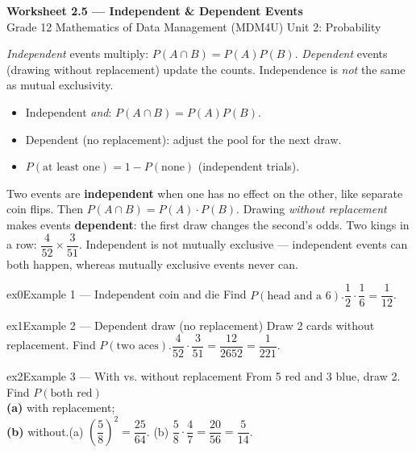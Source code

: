 \documentclass[11pt]{article}
\begin{document}
\begin{center}
{\LARGE\bfseries\color{titleblue}Worksheet 2.5 --- Independent \& Dependent Events}\\[2pt]
{\small Grade 12 Mathematics of Data Management (MDM4U) \textperiodcentered{} Unit 2: Probability}
\end{center}

\begin{ideabox}
\emph{Independent} events multiply: $P(A\cap B)=P(A)P(B)$. \emph{Dependent} events (drawing without replacement) update the counts. Independence is \emph{not} the same as mutual exclusivity.
\begin{itemize}[leftmargin=*,itemsep=2pt]
  \item Independent \emph{and}: $P(A\cap B)=P(A)P(B)$.
  \item Dependent (no replacement): adjust the pool for the next draw.
  \item $P(\text{at least one})=1-P(\text{none})$ (independent trials).
\end{itemize}
\end{ideabox}

\begin{learnbox}
Two events are \textbf{independent} when one has no effect on the other, like separate coin flips. Then $P(A\cap B)=P(A)\cdot P(B)$.
Drawing \emph{without replacement} makes events \textbf{dependent}: the first draw changes the second's odds. Two kings in a row: $\dfrac{4}{52}\times\dfrac{3}{51}$.
Independent is not mutually exclusive — independent events can both happen, whereas mutually exclusive events never can.
\end{learnbox}


\begin{example}{ex0}{Example 1 --- Independent coin and die}
Find $P(\text{head and a 6})$.\soln $\dfrac12\cdot\dfrac16=\dfrac{1}{12}$.
\end{example}

\begin{example}{ex1}{Example 2 --- Dependent draw (no replacement)}
Draw 2 cards without replacement. Find $P(\text{two aces})$.\soln $\dfrac{4}{52}\cdot\dfrac{3}{51}=\dfrac{12}{2652}=\dfrac{1}{221}$.
\end{example}

\begin{example}{ex2}{Example 3 --- With vs. without replacement}
From 5 red and 3 blue, draw 2. Find $P(\text{both red})$ \\ \textbf{(a)} with replacement; \\ \textbf{(b)} without.\soln (a) $\left(\dfrac58\right)^2=\dfrac{25}{64}$. (b) $\dfrac58\cdot\dfrac47=\dfrac{20}{56}=\dfrac{5}{14}$.
\end{example}
\end{document}
